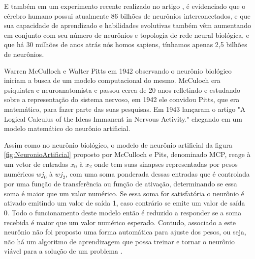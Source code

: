 E também em um experimento recente realizado no artigo , é evidenciado que o cérebro humano possui atualmente 86 bilhões de neurônios interconectados, e que sua capacidade de aprendizado e habilidades evolutivas também vêm aumentando em conjunto com seu número de neurônios e topologia de rede neural biológica, e que há 30 milhões de anos atrás nós homos sapiens, tínhamos apenas 2,5 bilhões de neurônios.

Warren McCulloch e Walter Pitts em 1942 observando o neurônio biológico iniciam a busca de um modelo computacional do mesmo. McCuloch era psiquiatra e neuroanatomista e passou cerca de 20 anos refletindo e estudando sobre a representação do sistema nervoso, em 1942 ele convidou Pitts, que era matemático, para fazer parte das suas pesquisas. Em 1943 lançaram o artigo "A Logical Calculus of the Ideas Immanent in Nervous Activity." chegando em um modelo matemático do neurônio artificial. 

            \begin{figure}[H]
            \end{figure}

Assim como no neurônio biológico, o modelo de neurônio artificial da figura \ref{fig:NeuronioArtificial} proposto por McCulloch e Pits, denominado MCP, reage à um vetor de entradas $x_0$ à $x_2$ onde tem suas sinapses representadas por pesos numéricos $wj_0$ à $wj_2$, com uma soma ponderada dessas entradas que é controlada por uma função de transferência ou função de ativação, determinando se essa soma é maior que um valor numérico. Se essa soma for satisfatória o neurônio é ativado emitindo um valor de saída 1, caso contrário se emite um valor de saída 0.
Todo o funcionamento deste modelo então é reduzido a responder se a soma recebida é maior que um valor numérico esperado. Contudo, associado a este neurônio não foi proposto uma forma automática para ajuste dos pesos, ou seja, não há um algoritmo de aprendizagem que possa treinar e tornar o neurônio viável para a solução de um problema \cite{Haykin1994}.
        
